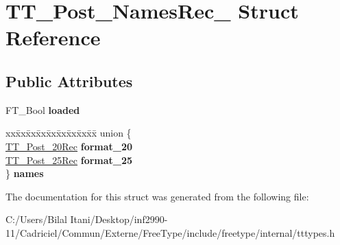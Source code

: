 \hypertarget{struct_t_t___post___names_rec__}{}\section{T\+T\+\_\+\+Post\+\_\+\+Names\+Rec\+\_\+ Struct Reference}
\label{struct_t_t___post___names_rec__}
\subsection*{Public Attributes}
\begin{DoxyCompactItemize}
\item 
F\+T\+\_\+\+Bool {\bfseries loaded}\hypertarget{struct_t_t___post___names_rec___a8878ac4555c3df60958869f0d53383c9}{}\label{struct_t_t___post___names_rec___a8878ac4555c3df60958869f0d53383c9}

\item 
\begin{tabbing}
xx\=xx\=xx\=xx\=xx\=xx\=xx\=xx\=xx\=\kill
union \{\\
\>\hyperlink{struct_t_t___post__20_rec__}{TT\_Post\_20Rec} {\bfseries format\_20}\\
\>\hyperlink{struct_t_t___post__25__}{TT\_Post\_25Rec} {\bfseries format\_25}\\
\} {\bfseries names}\hypertarget{struct_t_t___post___names_rec___a6588c0cf135465501f71286c47470937}{}\label{struct_t_t___post___names_rec___a6588c0cf135465501f71286c47470937}
\\

\end{tabbing}\end{DoxyCompactItemize}


The documentation for this struct was generated from the following file\+:\begin{DoxyCompactItemize}
\item 
C\+:/\+Users/\+Bilal Itani/\+Desktop/inf2990-\/11/\+Cadriciel/\+Commun/\+Externe/\+Free\+Type/include/freetype/internal/tttypes.\+h\end{DoxyCompactItemize}
